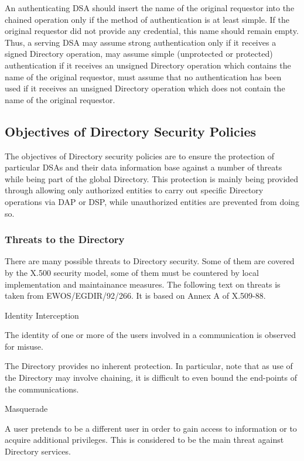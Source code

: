 \m An authenticating DSA should insert the name of the original requestor into
  the chained operation only if the method of authentication is at least simple.
  If the original requestor did not provide any credential, this name should
  remain empty. Thus, a serving DSA
\bi
\m may assume strong authentication only if it receives a signed Directory
    operation,
\m may assume simple (unprotected or protected) authentication if it receives
    an unsigned Directory operation which contains the name of the original
    requestor,
\m must assume that no authentication has been used if it receives an unsigned
    Directory operation which does not contain the name of the original requestor.
\ei
\ei
\subsection{Objectives of Directory Security Policies}

The objectives of Directory security policies are to ensure the protection of 
particular DSAs and their data information base against a number of threats
while being part of the global Directory. This protection is mainly being
provided through allowing only authorized entities to carry out specific
Directory operations via DAP or DSP, while unauthorized entities are prevented 
from doing so.


\subsubsection{Threats to the Directory}


There are many possible threats to Directory security. Some of them are covered
by the X.500 security model, some of them must be countered by local implementation
and maintainance measures. The following text on threats is taken from 
EWOS/EGDIR/92/266. It is based on Annex A of X.509-88. 

\bi
\m Identity Interception

The identity of one or more of the users involved in a communication is observed
for misuse.

The Directory provides no inherent protection. In particular, note that as use of
the Directory may involve chaining, it is difficult to even bound the end-points
of the communications.


\m Masquerade


A user pretends to be a different user in order to gain access to information or
to acquire additional privileges. This is considered to be the main threat
against Directory services.

